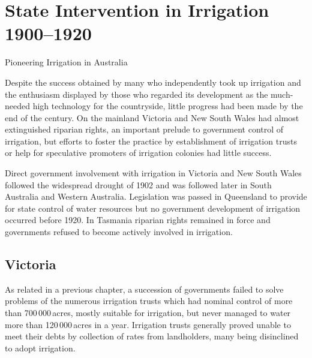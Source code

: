 
\setcounter{endnote}{0}

\chapter{State Intervention in Irrigation 1900--1920}
\label{ch:stateint}
%
{Pioneering Irrigation in Australia}

Despite the success obtained by many who independently took up
irrigation and the enthusiasm displayed by those who regarded its
development as the much-needed high technology for the countryside,
little progress had been made by the end of the century.  On the
mainland Victoria and New South Wales had almost extinguished riparian
rights, an important prelude to government control of irrigation, but
efforts to foster the practice by establishment of irrigation trusts
or help for speculative promoters of irrigation colonies had little
success.

Direct government involvement with irrigation in Victoria and New
South Wales followed the widespread drought of 1902 and was followed
later in South Australia and Western Australia.  Legislation was
passed in Queensland to provide for state control of water resources
but no government development of irrigation occurred before 1920.  In
Tasmania riparian rights remained in force and governments refused to
become actively involved in irrigation.

\section*{Victoria}

As related in a previous chapter, a succession of governments failed
to solve problems of the numerous irrigation trusts which had nominal
control of more than 700\,000\,acres, mostly suitable for irrigation, but
never managed to water more than 120\,000\,acres in a year.  Irrigation
trusts generally proved unable to meet their debts by collection of
rates from landholders, many being disinclined to adopt
irrigation.

